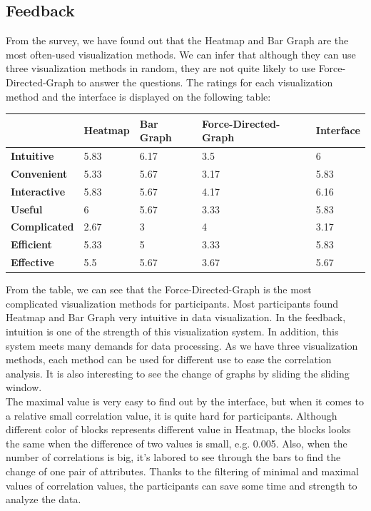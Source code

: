 \subsection{Feedback}
From the survey, we have found out that the Heatmap and Bar Graph are the most often-used visualization methods. We can infer that although they can use three visualization methods in random, they are not quite likely to use Force-Directed-Graph to answer the questions. The ratings for each visualization method and the interface is displayed on the following table:
	\begin{center}
	\begin{tabular}{ | l | l | l | l | l | }
		\hline
		                     & Heatmap & Bar Graph & Force-Directed-Graph & Interface \\ \hline
		\textbf{Intuitive}   & 5.83    & 6.17      & 3.5                  & 6         \\ \hline
		\textbf{Convenient}  & 5.33    & 5.67      & 3.17                 & 5.83      \\ \hline
		\textbf{Interactive} & 5.83    & 5.67      & 4.17                 & 6.16      \\ \hline
		\textbf{Useful}      & 6       & 5.67      & 3.33                 & 5.83      \\ \hline
		\textbf{Complicated} & 2.67    & 3         & 4                    & 3.17      \\ \hline
		\textbf{Efficient}   & 5.33    & 5         & 3.33                 & 5.83      \\ \hline
		\textbf{Effective}   & 5.5     & 5.67      & 3.67                 & 5.67      \\ \hline
	\end{tabular}
\end{center}
From the table, we can see that the Force-Directed-Graph is the most complicated visualization methods for participants. Most participants found Heatmap and Bar Graph very intuitive in data visualization. In the feedback, intuition is one of the strength of this visualization system. In addition, this system meets many demands for data processing. As we have three visualization methods, each method can be used for different use to ease the correlation analysis. It is also interesting to see the change of graphs by sliding the sliding window.\\
The maximal value is very easy to find out by the interface, but when it comes to a relative small correlation value, it is quite hard for participants. Although different color of blocks represents different value in Heatmap, the blocks looks the same when the difference of two values is small, e.g. 0.005. Also, when the number of correlations is big, it's labored to see through the bars to find the change of one pair of attributes. Thanks to the filtering of minimal and maximal values of correlation values, the participants can save some time and strength to analyze the data.\\

